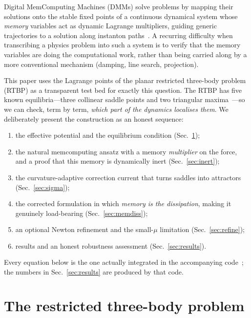 \documentclass[10pt,twocolumn]{article}
\begin{document}
Digital MemComputing Machines (DMMs) solve problems by mapping their solutions
onto the stable fixed points of a continuous dynamical system whose
\emph{memory} variables act as dynamic Lagrange multipliers, guiding generic
trajectories to a solution along instanton paths~\cite{diventra2022,
traversa2015,diventra2018}. A recurring difficulty when transcribing a physics
problem into such a system is to verify that the memory variables are doing the
computational work, rather than being carried along by a more conventional
mechanism (damping, line search, projection).

This paper uses the Lagrange points of the planar restricted three-body problem
(RTBP) as a transparent test bed for exactly this question. The RTBP has five
known equilibria---three collinear saddle points and two triangular
maxima~\cite{lagrange1772,szebehely1967}---so we can check, term by term,
\emph{which part of the dynamics localises them}. We deliberately present the
construction as an honest sequence:

\begin{enumerate}
\item the effective potential and the equilibrium condition
  (Sec.~\ref{sec:rtbp});
\item the natural memcomputing ansatz with a memory \emph{multiplier} on the
  force, and a proof that this memory is dynamically inert
  (Sec.~\ref{sec:inert});
\item the curvature-adaptive correction current that turns saddles into
  attractors (Sec.~\ref{sec:sigma});
\item the corrected formulation in which \emph{memory is the dissipation},
  making it genuinely load-bearing (Sec.~\ref{sec:memdiss});
\item an optional Newton refinement and the small-$\mu$ limitation
  (Sec.~\ref{sec:refine});
\item results and an honest robustness assessment (Sec.~\ref{sec:results}).
\end{enumerate}

Every equation below is the one actually integrated in the accompanying
code~\cite{github2026}; the numbers in Sec.~\ref{sec:results} are produced by
that code.

\section{The restricted three-body problem}\label{sec:rtbp}
\end{document}

